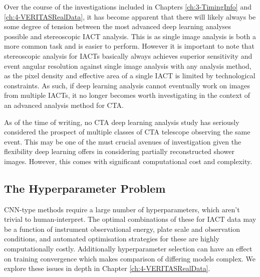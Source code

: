 Over the course of the investigations included in Chapters \ref{ch:3-TimingInfo} and \ref{ch:4-VERITASRealData}, it has become apparent that there will likely always be some degree of tension between the most advanced deep learning analyses possible and stereoscopic IACT analysis. This is as single image analysis is both a more common task and is easier to perform.  However it is important to note that stereoscopic analysis for IACTs basically always achieves superior sensitivity and event angular resolution against single image analysis with any analysis method, as the pixel density and effective area of a single IACT is limited by technological constraints. As such, if deep learning analysis cannot eventually work on images from multiple IACTs, it no longer becomes worth investigating in the context of an advanced analysis method for CTA.

As of the time of writing, no CTA deep learning analysis study has seriously considered the prospect of multiple classes of CTA telescope observing the same event. This may be one of the must crucial avenues of investigation given the flexibility deep learning offers in considering partially reconstructed shower images. However, this comes with significant computational cost and complexity.

\subsection{The Hyperparameter Problem}
CNN-type methods require a large number of hyperparameters, which aren't trivial to human-interpret. The optimal combinations of these for IACT data may be a function of instrument observational energy, plate scale and observation conditions, and automated optimisation strategies for these are highly computationally costly. Additionally hyperparameter selection can have an effect on training convergence which makes comparison of differing models complex. We explore these issues in depth in Chapter \ref{ch:4-VERITASRealData}.

